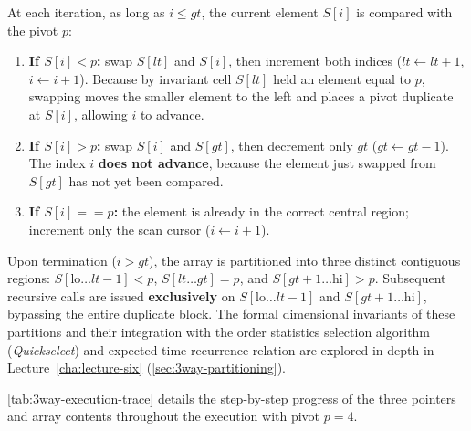 At each iteration, as long as $i \le gt$, the current element $S[i]$ is compared with the pivot $p$:
\begin{enumerate}
  \item \textbf{If $S[i] < p$:} swap $S[lt]$ and $S[i]$, then increment both indices ($lt \leftarrow lt + 1$, $i \leftarrow i + 1$). Because by invariant cell $S[lt]$ held an element equal to $p$, swapping moves the smaller element to the left and places a pivot duplicate at $S[i]$, allowing $i$ to advance.
  \item \textbf{If $S[i] > p$:} swap $S[i]$ and $S[gt]$, then decrement only $gt$ ($gt \leftarrow gt - 1$). The index $i$ \textbf{does not advance}, because the element just swapped from $S[gt]$ has not yet been compared.
  \item \textbf{If $S[i] == p$:} the element is already in the correct central region; increment only the scan cursor ($i \leftarrow i + 1$).
\end{enumerate}

Upon termination ($i > gt$), the array is partitioned into three distinct contiguous regions: $S[\text{lo} \dots lt-1] < p$, $S[lt \dots gt] = p$, and $S[gt+1 \dots \text{hi}] > p$. Subsequent recursive calls are issued \textbf{exclusively} on $S[\text{lo} \dots lt-1]$ and $S[gt+1 \dots \text{hi}]$, bypassing the entire duplicate block. The formal dimensional invariants of these partitions and their integration with the order statistics selection algorithm (\textit{Quickselect}) and expected-time recurrence relation are explored in depth in Lecture~\ref{cha:lecture-six} (\autoref{sec:3way-partitioning}).

\autoref{tab:3way-execution-trace} details the step-by-step progress of the three pointers and array contents throughout the execution with pivot $p = 4$.

